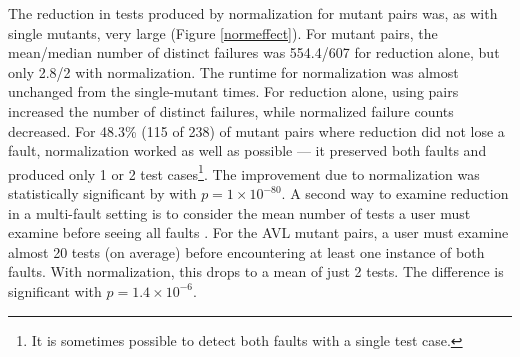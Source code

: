 The reduction in tests produced by normalization for mutant pairs
was, as with single mutants, very large (Figure \ref{normeffect}).
For mutant pairs, the mean/median number of distinct failures was
554.4/607 for reduction alone, but only 2.8/2 with
normalization.  The runtime for normalization was almost
unchanged from the single-mutant times.  For reduction
alone, using pairs increased the number of distinct failures, while
normalized failure counts decreased.  For 48.3\% (115 of 238) of
mutant pairs where reduction did not lose a fault, normalization
worked as well as possible --- it preserved both faults and produced only 1 or 2 test
cases\footnote{It is sometimes possible to detect both faults with a single test
  case.}.  The improvement due to normalization was
statistically significant by with $p=1\times10^{-80}$.
A second way to examine reduction in a multi-fault setting is to
consider the mean number of tests a user must examine before seeing
all faults \cite{PLDI13}.  For the AVL mutant pairs, a user must
examine almost 20 tests (on average) before encountering at least
one instance of both faults.  With normalization, this  drops
to a mean of just 2 tests.  The difference is significant with $p=1.4\times10^{-6}$.

